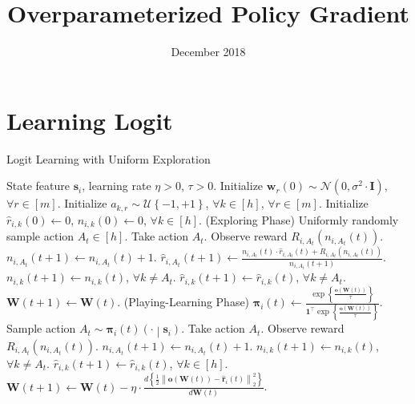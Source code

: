 \documentclass[10pt]{article}
\title{Overparameterized Policy Gradient}
\author{}
\date{December 2018}
\def\rvo{{\mathbf{o}}}
\def\rvr{{\mathbf{r}}}
\def\rvs{{\mathbf{s}}}
\def\rvw{{\mathbf{w}}}
\def\rvo{{\mathbf{o}}}
\def\rvone{{\mathbf{1}}}
\def\rvpi{{\boldsymbol{\pi}}}
\def\rmI{{\mathbf{I}}}
\def\rmW{{\mathbf{W}}}
\def\gN{{\mathcal{N}}}
\def\gU{{\mathcal{U}}}
\begin{document}

\section{Learning Logit}

\begin{algorithm}[h]
   \caption{Logit Learning with Uniform Exploration}
\label{alg:policy_gradient_uniform_exploration}
\begin{algorithmic}
    State feature $\rvs_i$, learning rate $\eta > 0$, $\tau > 0$.
   \STATE Initialize $\rvw_r(0) \sim \gN\left( 0, \sigma^2 \cdot \rmI \right)$, $\forall r \in [m]$. \STATE Initialize $a_{k, r} \sim \gU\left\{-1, +1\right\}$, $\forall k \in [h]$, $\forall r \in [m]$.
   \STATE Initialize $\hat{r}_{i,k}\left(0\right) \gets 0$, $n_{i,k}\left(0\right) \gets 0$, $\forall k \in [h]$.
   \STATE (Exploring Phase)
   \STATE Uniformly randomly sample action $A_{t} \in [h]$.
   \STATE Take action $A_{t}$. Observe reward $R_{i, A_{t}}\left(n_{i, A_{t}}\left(t\right) \right)$.
   \STATE $n_{i, A_{t}}\left(t+1\right) \gets n_{i, A_{t}}\left(t\right) + 1$.
   \STATE $\hat{r}_{i,A_{t}}\left(t+1\right) \gets \frac{n_{i, A_{t}}\left(t\right) \cdot \hat{r}_{i,A_{t}}\left(t\right) + R_{i, A_{t}}\left(n_{i, A_{t}}\left(t\right)\right) }{n_{i, A_{t}}\left(t+1\right)}$.
   \STATE $n_{i, k}\left(t+1\right) \gets n_{i, k}\left(t\right)$, $\forall k \not= A_t$.
   \STATE $\hat{r}_{i,k}\left(t+1\right) \gets \hat{r}_{i,k}\left(t\right)$, $\forall k \not= A_t$.
   \STATE $\rmW(t+1) \leftarrow \rmW(t)$.
   \ELSE
   \STATE (Playing-Learning Phase)
   \STATE $\rvpi_i\left(t\right) \gets \frac{ \exp\left\{ \frac{ \rvo\left( \rmW\left(t\right)\right) }{\tau} \right\} }{\rvone^\top \exp\left\{ \frac{ \rvo\left( \rmW\left(t\right)\right) }{\tau} \right\} } $.
   \STATE Sample action $A_{t} \sim \rvpi_{i}\left(t\right)\left(\cdot \middle| \rvs_i \right)$.
   \STATE Take action $A_{t}$. Observe reward $R_{i, A_{t}}\left(n_{i, A_{t}}\left(t\right) \right)$.
   \STATE $n_{i, A_{t}}\left(t+1\right) \gets n_{i, A_{t}}\left(t\right) + 1$.
   \STATE $n_{i, k}\left(t+1\right) \gets n_{i, k}\left(t\right)$, $\forall k \not= A_t$.
   \STATE $\hat{r}_{i,k}\left(t+1\right) \gets \hat{r}_{i,k}\left(t\right)$, $\forall k \in \left[ h \right]$.
   \STATE $\rmW(t+1) \leftarrow \rmW(t) - \eta \cdot \frac{d \left\{ \frac{1}{2} \left\| \rvo\left( \rmW\left(t\right)\right) - \hat{\rvr}_i\left(t\right) \right\|_2^2 \right\}}{d \rmW(t)}$.
   \ENDIF
   \ENDFOR
\end{algorithmic}
\end{algorithm}
\end{document}
